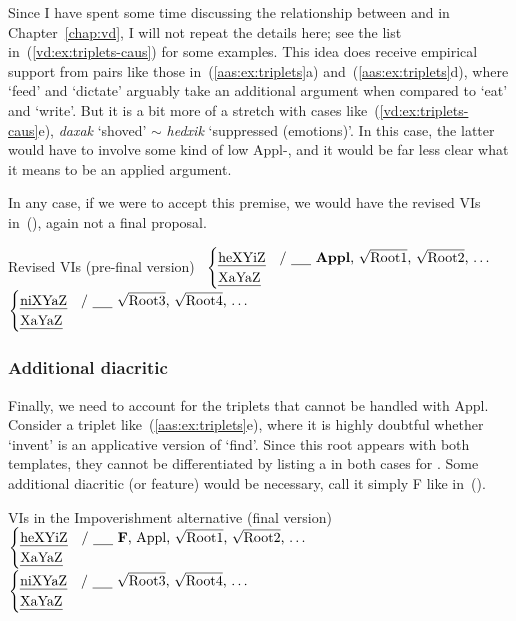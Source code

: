 Since I have spent some time discussing the relationship between {\tkal} and {\thif} in Chapter~\ref{chap:vd}, I will not repeat the details here; see the list in~(\ref{vd:ex:triplets-caus}) for some examples. This idea does receive empirical support from pairs like those in~(\ref{aas:ex:triplets}a) and~(\ref{aas:ex:triplets}d), where `feed' and `dictate' arguably take an additional argument when compared to `eat' and `write'. But it is a bit more of a stretch with cases like~(\ref{vd:ex:triplets-caus}e), \emph{daxak} `shoved' $\sim$ \emph{hedxik} `suppressed (emotions)'. In this case, the latter would have to involve some kind of low Appl-, and it would be far less clear what it means to be an applied argument.

In any case, if we were to accept this premise, we would have the revised VIs in~(\nextx), again not a final proposal.

\pex Revised VIs (pre-final version)
	\a {\vds} \lra~$\begin{cases}
		\text{\thif} & \text{/ \trace~\textbf{Appl}, \root{Root1}, \root{Root2}, \dots}\\
		\text{\tkal} & \\
		\end{cases}$
	\a {\vzs} \lra~$\begin{cases}
		\text{\tnif} & \text{/ \trace~\root{Root3}, \root{Root4}, \dots}\\
		\text{\tkal} & \\
		\end{cases}$
\xe

		\subsubsection{Additional diacritic}
Finally, we need to account for the triplets that cannot be handled with Appl. Consider a triplet like~(\ref{aas:ex:triplets}e), where it is highly doubtful whether `invent' is an applicative version of `find'. Since this root appears with both templates, they cannot be differentiated by listing a  in both cases for {\vds}. Some additional diacritic (or feature) would be necessary, call it simply F like in~(\nextx).

\pex \label{aas:ex:jim-vis}VIs in the Impoverishment alternative (final version)
	\a {\vds} \lra~$\begin{cases}
		\text{\thif} & \text{/ \trace~\textbf{F}, Appl, \root{Root1}, \root{Root2}, \dots}\\
		\text{\tkal} & \\
		\end{cases}$
	\a {\vzs} \lra~$\begin{cases}
		\text{\tnif} & \text{/ \trace~\root{Root3}, \root{Root4}, \dots}\\
		\text{\tkal} & \\
		\end{cases}$
\xe

